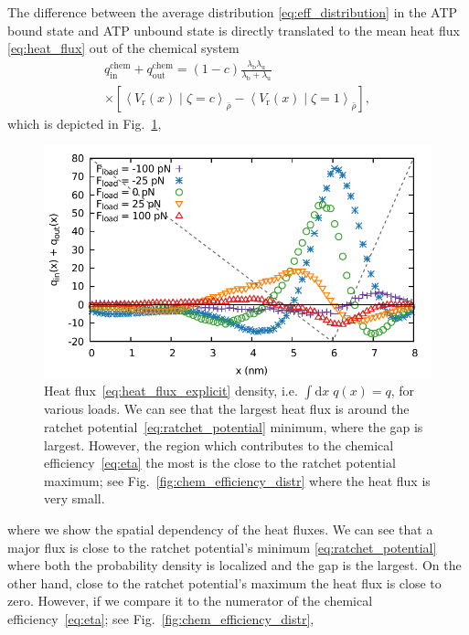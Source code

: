 \documentclass[aps,pre,twocolumn,showpacs,showkeys,superscriptaddress,floatfix]{revtex4-1}
\newcommand{\rmd}{{\mathrm d}}
\begin{document}
The difference between the average distribution \eqref{eq:eff_distribution} in the ATP bound state and ATP unbound state is directly translated to the mean heat flux \eqref{eq:heat_flux} out of the chemical system
\begin{multline}
q_\text{in}^\text{chem} + q_\text{out}^\text{chem} 
= (1-c) \frac{ \lambda_\text{b} \lambda_\text{u} }{ \lambda_\text{b} + \lambda_\text{u} } 
\\ \times
\left[ \left\langle V_\text{r}(x) \middle| \zeta = c \right\rangle_{\bar{\rho}} - \left\langle V_\text{r}(x) \middle| \zeta = 1 \right\rangle_{\bar{\rho}} \right] ,
\label{eq:heat_flux_explicit}
\end{multline} 
which is depicted in Fig.~\ref{fig:chem_energy_distr}, 
\begin{figure}[t]
\centering
\includegraphics[width=0.9\linewidth,height=!]{chem_energy_distr_all_F}
\caption{
\label{fig:chem_energy_distr}
Heat flux~\eqref{eq:heat_flux_explicit} density, i.e. $\int \rmd x \; q(x) = q$, for various loads.  
We can see that the largest heat flux is around the ratchet potential~\eqref{eq:ratchet_potential} minimum, where the gap is largest. 
However, the region which contributes to the chemical efficiency~\eqref{eq:eta} the most is the close to the ratchet potential maximum;
see Fig.~\ref{fig:chem_efficiency_distr} where the heat flux is very small. 
}
\end{figure}
where we show the spatial dependency of the heat fluxes.
We can see that a major flux is close to the ratchet potential's minimum \eqref{eq:ratchet_potential} where both the probability density is localized and the gap is the largest. 
On the other hand, close to the ratchet potential's maximum the heat flux is close to zero.
However, if we compare it to the numerator of the chemical efficiency~\eqref{eq:eta}; see Fig.~\ref{fig:chem_efficiency_distr}, 
\end{document}
